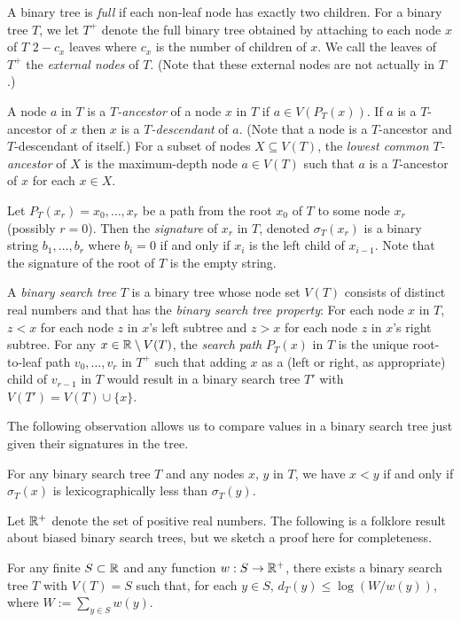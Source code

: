 \documentclass[kpfonts]{patmorin}
\let\le\leqslant
\begin{document}
A binary tree is \emph{full} if each non-leaf node has exactly two children. For a binary tree $T$, we let $T^+$ denote the full binary tree obtained by attaching to each node $x$ of $T$ $2-c_x$ leaves where $c_x$ is the number of children of $x$.  We call the leaves of $T^+$ the \emph{external nodes} of $T$.  (Note that these external nodes are not actually in $T$.)

A node $a$ in $T$ is a \emph{$T$-ancestor} of a node $x$ in $T$ if $a\in V(P_T(x))$. If $a$ is a $T$-ancestor of $x$ then $x$ is a \emph{$T$-descendant} of $a$. (Note that a node is a $T$-ancestor and $T$-descendant of itself.)  For a subset of nodes $X\subseteq V(T)$, the \emph{lowest common $T$-ancestor} of $X$ is the maximum-depth node $a\in V(T)$ such that $a$ is a $T$-ancestor of $x$ for each $x\in X$.

Let $P_T(x_r)=x_0,\ldots,x_{r}$ be a path from the root $x_0$ of $T$ to some node $x_r$ (possibly $r=0$).  Then the \emph{signature} of $x_r$ in $T$, denoted $\sigma_T(x_r)$ is a binary string $b_1,\ldots,b_r$ where $b_i=0$ if and only if $x_{i}$ is the left child of $x_{i-1}$.
Note that the signature of the root of $T$ is the empty string.

A \emph{binary search tree} $T$ is a binary tree whose node set $V(T)$ consists of distinct real numbers and that has the \emph{binary search tree property}:  For each node $x$ in $T$, $z<x$ for each node $z$ in $x$'s left subtree and $z>x$ for each node $z$ in $x$'s right subtree. For any $x\in\mathbb{R}\setminus V(T)$, the \emph{search path} $P_T(x)$ in $T$ is the unique root-to-leaf path $v_0,\ldots,v_r$ in $T^+$ such that adding $x$ as a (left or right, as appropriate) child of $v_{r-1}$ in $T$ would result in a binary search tree $T'$ with $V(T')=V(T)\cup\{x\}$.

The following observation allows us to compare values in a binary search tree just given their signatures in the tree.

\begin{obs}
  For any binary search tree $T$ and any nodes $x$, $y$ in $T$, we have $x<y$ if and only if $\sigma_T(x)$ is lexicographically less than $\sigma_T(y)$.
\end{obs}

Let $\mathbb{R}^+$ denote the set of positive real numbers. The following is a folklore result about biased binary search trees, but we sketch a proof here for completeness.

\begin{lem}
  For any finite $S\subset \mathbb{R}$ and any function $w:S\to\mathbb{R}^+$, there exists a binary search tree $T$ with $V(T)=S$ such that, for each $y\in S$, $d_T(y)\le\log(W/w(y))$, where $W:=\sum_{y\in S} w(y)$.
\end{lem}
\end{document}

